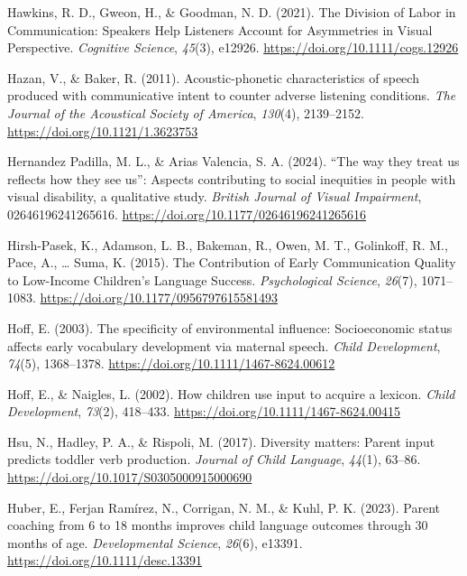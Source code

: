 \documentclass[
  man,floatsintext]{apa6}
\newlength{\cslhangindent}
\newlength{\cslentryspacingunit} %
\newenvironment{CSLReferences}[2] %
 {%
  \setlength{\parindent}{0pt}
  \ifodd #1
  \let\oldpar\par
  \def\par{\hangindent=\cslhangindent\oldpar}
  \fi
  \setlength{\parskip}{#2\cslentryspacingunit}
 }%
 {}
\begin{document}
\begin{CSLReferences}{1}{0}
\leavevmode{}%
Hawkins, R. D., Gweon, H., \& Goodman, N. D. (2021). The {Division} of {Labor} in {Communication}: {Speakers Help Listeners Account} for {Asymmetries} in {Visual Perspective}. \emph{Cognitive Science}, \emph{45}(3), e12926. \url{https://doi.org/10.1111/cogs.12926}

\leavevmode{}%
Hazan, V., \& Baker, R. (2011). Acoustic-phonetic characteristics of speech produced with communicative intent to counter adverse listening conditions. \emph{The Journal of the Acoustical Society of America}, \emph{130}(4), 2139--2152. \url{https://doi.org/10.1121/1.3623753}

\leavevmode{}%
Hernandez Padilla, M. L., \& Arias Valencia, S. A. (2024). {``{The} way they treat us reflects how they see us''}: {Aspects} contributing to social inequities in people with visual disability, a qualitative study. \emph{British Journal of Visual Impairment}, 02646196241265616. \url{https://doi.org/10.1177/02646196241265616}

\leavevmode{}%
Hirsh-Pasek, K., Adamson, L. B., Bakeman, R., Owen, M. T., Golinkoff, R. M., Pace, A., \ldots{} Suma, K. (2015). The {Contribution} of {Early Communication Quality} to {Low-Income Children}'s {Language Success}. \emph{Psychological Science}, \emph{26}(7), 1071--1083. \url{https://doi.org/10.1177/0956797615581493}

\leavevmode{}%
Hoff, E. (2003). The specificity of environmental influence: Socioeconomic status affects early vocabulary development via maternal speech. \emph{Child Development}, \emph{74}(5), 1368--1378. \url{https://doi.org/10.1111/1467-8624.00612}

\leavevmode{}%
Hoff, E., \& Naigles, L. (2002). How children use input to acquire a lexicon. \emph{Child Development}, \emph{73}(2), 418--433. \url{https://doi.org/10.1111/1467-8624.00415}

\leavevmode{}%
Hsu, N., Hadley, P. A., \& Rispoli, M. (2017). Diversity matters: Parent input predicts toddler verb production. \emph{Journal of Child Language}, \emph{44}(1), 63--86. \url{https://doi.org/10.1017/S0305000915000690}

\leavevmode{}%
Huber, E., Ferjan Ramírez, N., Corrigan, N. M., \& Kuhl, P. K. (2023). Parent coaching from 6 to 18 months improves child language outcomes through 30 months of age. \emph{Developmental Science}, \emph{26}(6), e13391. \url{https://doi.org/10.1111/desc.13391}


\end{CSLReferences}
\end{document}
